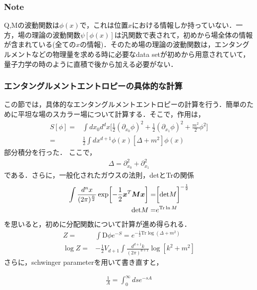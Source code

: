 \newpage

\subsubsection{Note}

\hrulefill

Q,Mの波動関数は$\phi(x)$で，これは位置$x$における情報しか持っていない．一方，場の理論の波動関数$\psi[\phi(x)]$は汎関数で表されて，初めから場全体の情報が含まれている(全ての$x$の情報)．そのため場の理論の波動関数は，エンタングルメントなどの物理量を求める時に必要なdata setが初めから用意されていて，量子力学の時のように直積で後から加える必要がない．

\hrulefill

\subsubsection{エンタングルメントエントロピーの具体的な計算}
この節では，具体的なエンタングルメントエントロピーの計算を行う．簡単のために平坦な場のスカラー場について計算する．そこで，作用は，
\begin{align}
  S[\phi]=&\int dx_0d^dx\biggl[\frac{1}{2}(\partial_{x_0}\phi)^2+\frac{1}{2}(\partial_{x_1}\phi)^2+\frac{m^2}{2}\phi^2\biggr]\\
  =&\frac{1}{2}\int dx^{d+1}\phi(x)[\Delta+m^2]\phi(x)
\end{align}
部分積分を行った．
ここで，
\begin{align}
  \Delta=\partial_{x_0}^2+\partial_{x_1}^2
\end{align}
である．さらに，一般化されたガウスの法則，detとTrの関係
\begin{align}
  \int\frac{d^nx}{(2\pi)^{\frac{n}{2}}}\exp\biggl[-\frac{1}{2}\mbox{\boldmath$x$}^{T}\mbox{\boldmath$M$}\mbox{\boldmath$x$}\biggr]=&\biggl[\mathrm{det}M\biggr]^{-\frac{1}{2}} \\
  \mathrm{det}M=&e^{\mathrm{Tr}\ln M}
\end{align}
を思いると，初めに分配関数について計算が進め得られる．
\begin{align}
  \label{logZ}
  Z=&\int\mathrm{D}\phi e^{-S}=e^{-\frac{1}{2}\mathrm{Tr}\log(\Delta+m^2)} \\
  \log Z=&-\frac{1}{2}V_{d+1}\int\frac{d^{d+1}k}{(2\pi)^{d+1}}\log[k^2+m^2]
\end{align}
さらに，schwinger parameterを用いて書き直すと，
\begin{empheqboxed}

  \begin{align}
    \frac{1}{A}=\int^{\infty}_{0}ds e^{-sA}
  \end{align}

\end{empheqboxed}
